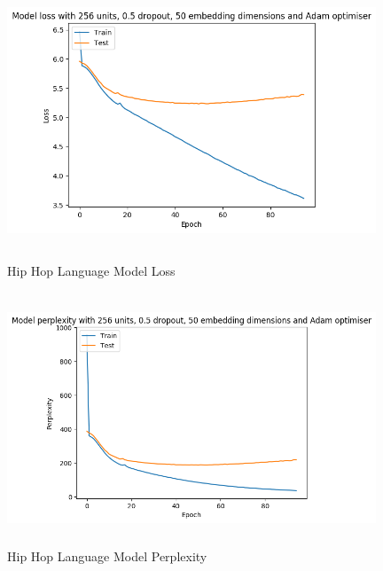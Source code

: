 \documentclass[a4paper,11pt]{report}
\begin{document}
\begin{figure}[ht]
	\centering
	\includegraphics[width=11cm, height=7.5cm]{./figures/hiphoploss}
	\caption{Hip Hop Language Model Loss}
	\label{fig:poploss}
	
	\includegraphics[width=11cm, height=7.5cm]{./figures/hiphopper}
	\caption{Hip Hop Language Model Perplexity}
	\label{fig:popper}
\end{figure}
\end{document}
